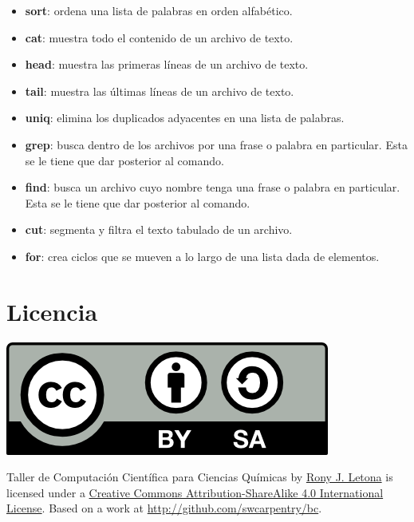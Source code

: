 \documentclass[10pt,letterpaper]{article}
\begin{document}
\begin{small}
\begin{itemize}
\item \textbf{sort}: ordena una lista de palabras en orden alfab\'etico.
\item \textbf{cat}: muestra todo el contenido de un archivo de texto.
\item \textbf{head}: muestra las primeras l\'ineas de un archivo de texto.
\item \textbf{tail}: muestra las \'ultimas l\'ineas de un archivo de texto.
\item \textbf{uniq}: elimina los duplicados adyacentes en una lista de palabras.
\item \textbf{grep}: busca dentro de los archivos por una frase o palabra en particular. Esta se le tiene que dar posterior al comando.
\item \textbf{find}: busca un archivo cuyo nombre tenga una frase o palabra en particular. Esta se le tiene que dar posterior al comando.
\item \textbf{cut}: segmenta y filtra el texto tabulado de un archivo.
\item \textbf{for}: crea ciclos que se mueven a lo largo de una lista dada de elementos.
\end{itemize}
\end{small}

\section*{Licencia}

\noindent \includegraphics{img/cc_big.png}

\noindent Taller de Computaci\'on Cient\'ifica para Ciencias Qu\'imicas by \href{http://github.com/zronyj/TQCA}{Rony J. Letona} is licensed under a \href{http://creativecommons.org/licenses/by-sa/4.0/}{Creative Commons Attribution-ShareAlike 4.0 International License}.
Based on a work at \url{http://github.com/swcarpentry/bc}.
\end{document}
